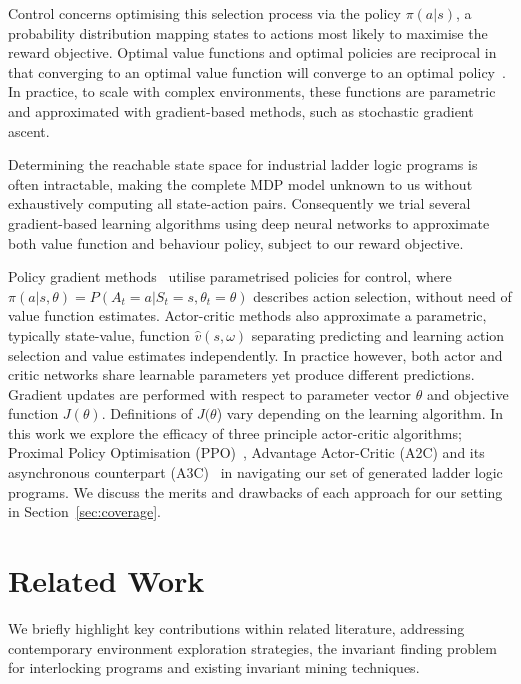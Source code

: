 \documentclass[runningheads]{llncs}
\begin{document}
Control concerns optimising this selection process via the policy $\pi(a|s)$, a probability distribution mapping states to actions most likely to maximise the reward objective. Optimal value functions and optimal policies are reciprocal in that converging to an optimal value function will converge to an optimal policy~\cite{melo2008analysis}. In practice, to scale with complex environments, these functions are parametric and approximated with gradient-based methods, such as stochastic gradient ascent.

Determining the reachable state space for industrial ladder logic programs is often intractable, making the complete MDP model unknown to us without exhaustively computing all state-action pairs. Consequently we trial several gradient-based learning algorithms using deep neural networks to approximate both value function and behaviour policy, subject to our reward objective. 

Policy gradient methods~\cite{kakade2001natural} utilise parametrised policies for control, where $\pi(a|s,\theta) = P(A_t=a|S_t=s,\theta_t=\theta)$ describes action selection, without need of value function estimates. Actor-critic methods also approximate a parametric, typically state-value, function $\hat{v}(s,\omega)$ separating predicting and learning action selection and value estimates independently. In practice however, both actor and critic networks share learnable parameters yet produce different predictions. Gradient updates are performed with respect to parameter vector $\theta$ and objective function $J(\theta)$. Definitions of $J(\theta$) vary depending on the learning algorithm. In this work we explore the efficacy of three principle actor-critic algorithms; Proximal Policy Optimisation (PPO)~\cite{schulman2017proximal}, Advantage Actor-Critic (A2C) and its asynchronous counterpart (A3C)~\cite{mnih2016asynchronous} in navigating our set of generated ladder logic programs. We discuss the merits and drawbacks of each approach for our setting in Section~\ref{sec:coverage}.

\section{Related Work}
We briefly highlight key contributions within related literature, addressing contemporary environment exploration strategies, the invariant finding problem for interlocking programs and existing invariant mining techniques.
\end{document}
